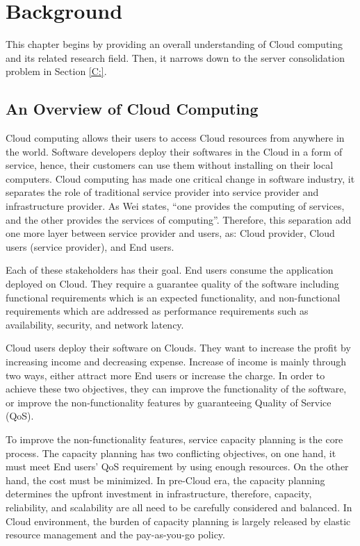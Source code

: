 \section{Background}

This chapter begins by providing an overall understanding of Cloud computing and its related research field.
Then, it narrows down to the server consolidation problem in Section \ref{C:}. 

\subsection{An Overview of Cloud Computing}

Cloud computing allows their users to access Cloud resources from anywhere in the world. Software developers deploy their softwares in the Cloud in a form of service, hence, their customers can use them without installing on their local computers. Cloud computing has made one critical change in software industry, it separates the role of traditional service provider into service provider and infrastructure provider. As Wei \cite{Wei:2010fn} states, ``one provides the computing of services, and the other provides the services of computing''. Therefore, this separation add one more layer between service provider and users, as: Cloud provider, Cloud users (service provider), and End users. 

Each of these stakeholders has their goal. 
End users consume the application deployed on Cloud. They require a guarantee quality of the software including functional requirements which is an expected functionality, and non-functional requirements which are addressed as performance requirements such as availability, security, and network latency.

Cloud users deploy their software on Clouds. They want to increase the profit by increasing income and decreasing expense. Increase of income is mainly through two ways, either attract more End users or increase the charge. In order to achieve these two objectives, they can improve the functionality of the software, or improve the non-functionality features by guaranteeing Quality of Service (QoS). 

To improve the non-functionality features, service capacity planning is the core process. The capacity planning has two conflicting objectives, on one hand, it must meet End users' QoS requirement by using enough resources.  On the other hand, the cost must be minimized. In pre-Cloud era, the capacity planning determines the upfront investment in infrastructure, therefore, capacity, reliability, and scalability are all need to be carefully considered and balanced. In Cloud environment, the burden of capacity planning is largely released by elastic resource management and the pay-as-you-go policy.

